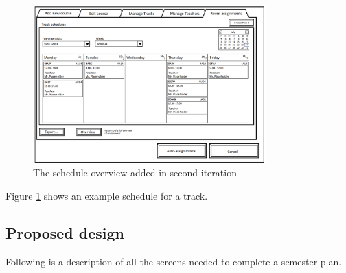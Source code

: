 \begin{figure}[htb]
\begin{center}
\leavevmode
\includegraphics[width=0.8\textwidth]{images/sem2_room_sche}
\end{center}
\caption{The schedule overview added in second iteration}
\label{fig:sem2_room_sche}
\end{figure}

Figure \ref{fig:sem2_room_sche} shows an example schedule for a track.


\subsection{Proposed design}
\label{subsec:proposed_design_sem}

Following is a description of all the screens needed to complete a semester plan.

